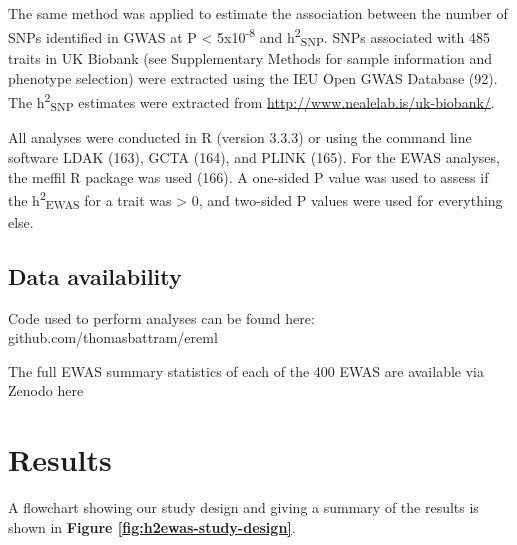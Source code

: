 \documentclass[11pt,oneside]{bristolthesis}
\begin{document}
The same method was applied to estimate the association between the number of SNPs identified in GWAS at P \textless{} 5x10\textsuperscript{-8} and h\textsuperscript{2}\textsubscript{SNP}. SNPs associated with 485 traits in UK Biobank (see Supplementary Methods for sample information and phenotype selection) were extracted using the IEU Open GWAS Database (92). The h\textsuperscript{2}\textsubscript{SNP} estimates were extracted from \url{http://www.nealelab.is/uk-biobank/}.

All analyses were conducted in R (version 3.3.3) or using the command line software LDAK (163), GCTA (164), and PLINK (165). For the EWAS analyses, the meffil R package was used (166). A one-sided P value was used to assess if the h\textsuperscript{2}\textsubscript{EWAS} for a trait was \textgreater{} 0, and two-sided P values were used for everything else.

\hypertarget{data-availability-05}{%
\subsection{Data availability}\label{data-availability-05}}

Code used to perform analyses can be found here: github.com/thomasbattram/ereml

The full EWAS summary statistics of each of the 400 EWAS are available via Zenodo here

\hypertarget{results-05}{%
\section{Results}\label{results-05}}

A flowchart showing our study design and giving a summary of the results is shown in \textbf{Figure \ref{fig:h2ewas-study-design}}.
\end{document}
